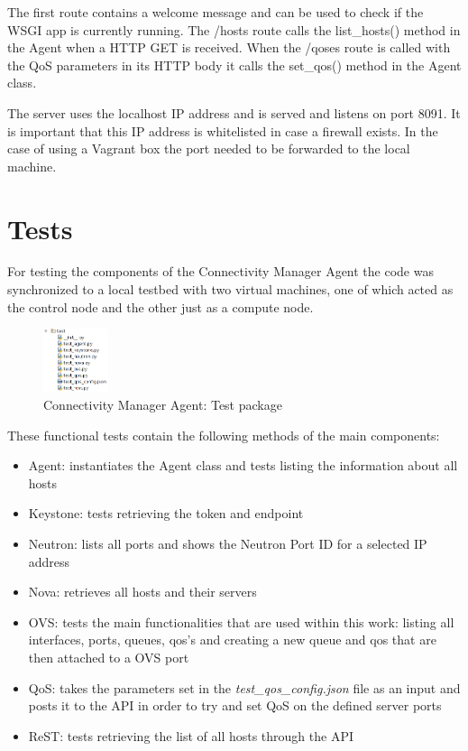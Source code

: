 The first route contains a welcome message and can be used to check if the WSGI app is currently running.
The /hosts route calls the list\_hosts() method in the Agent when a HTTP GET is received.
When the /qoses route is called with the QoS parameters in its HTTP body it calls the set\_qos() method in the Agent class.

The server uses the localhost IP address and is served and listens on port 8091. It is important that this IP address is whitelisted in case a firewall exists. In the case of using a Vagrant box the port needed to be forwarded to the local machine.

\section{Tests}

For testing the components of the Connectivity Manager Agent the code was synchronized to a local testbed with two virtual machines, one of which acted as the control node and the other just as a compute node. 

\begin{figure}[H]
\centering

\includegraphics[width=0.17\textwidth]{images/implementation/cma_tests.png}

\caption{Connectivity Manager Agent: Test package}
\end{figure}

These functional tests contain the following methods of the main components:
\begin{itemize}
\item Agent: instantiates the Agent class and tests listing the information about all hosts
\item Keystone: tests retrieving the token and endpoint
\item Neutron: lists all ports and shows the Neutron Port ID for a selected IP address
\item Nova: retrieves all hosts and their servers
\item OVS: tests the main functionalities that are used within this work: listing all interfaces, ports, queues, qos's and creating a new queue and qos that are then attached to a OVS port
\item QoS: takes the parameters set in the \textit{test\_qos\_config.json} file as an input and posts it to the API in order to try and set QoS on the defined server ports
\item ReST: tests retrieving the list of all hosts through the API
\end{itemize}

